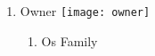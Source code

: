 \documentclass{article}
\begin{document}
\begin{enumerate}[I]
    General \texttt{[image: general]}
    \begin{enumerate}[I]
      \item
	A D M A N
	\begin{enumerate}[I]
	  \item
	    A\textunderscore D\textunderscore M\textunderscore N
	\end{enumerate}
      \item
	Moncat
    \end{enumerate}
  \item
    Owner \texttt{[image: owner]}
    \begin{enumerate}[I]
      \item
	Os Family
    \end{enumerate}
\end{enumerate}
\end{document}
